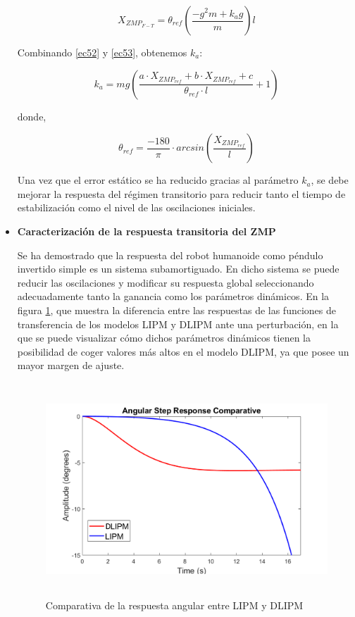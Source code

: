\begin{itemize}
\begin{equation}
X_{ZMP_{F-T}}=\theta_{ref}(\frac{-g^{2}m+k_{a}g}{m})l
\label{ec55}
\end{equation}

Combinando \ref{ec52} y \ref{ec53}, obtenemos $k_a$:

\begin{equation}
k_a=mg(\frac{a \cdot X_{ZMP_{ref}} + b \cdot X_{ZMP_{ref}} + c}{\theta_{ref}\cdot l}+1)
\label{ec56}
\end{equation}

donde,

\begin{equation}
\theta_{ref}=\frac{-180}{\pi}\cdot arcsin(\frac{X_{ZMP_{ref}}}{l})
\label{ec57}
\end{equation}

Una vez que el error estático se ha reducido gracias al parámetro $k_a$, se debe mejorar la respuesta del régimen transitorio para reducir tanto el tiempo de estabilización como el nivel de las oscilaciones iniciales.

\item \textbf{Caracterización de la respuesta transitoria del ZMP}

Se ha demostrado que la respuesta del robot humanoide como péndulo invertido simple es un sistema subamortiguado. En dicho sistema se puede reducir las oscilaciones y modificar su respuesta global seleccionando adecuadamente tanto la ganancia como los parámetros dinámicos. En la figura \ref{figura59}, que muestra la diferencia entre las respuestas de las funciones de transferencia de los modelos LIPM y DLIPM ante una perturbación, en la que se puede visualizar cómo dichos parámetros dinámicos tienen la posibilidad de coger valores más altos en el modelo DLIPM, ya que posee un mayor margen de ajuste. 

\begin{figure}[H]
\centering
\includegraphics[width=13cm, height=8cm]{imagenes/apartado_5/59_comparativa_paso}
\caption{Comparativa de la respuesta angular entre LIPM y DLIPM \cite{ref21}}
\label{figura59}
\end{figure}


\end{itemize}
